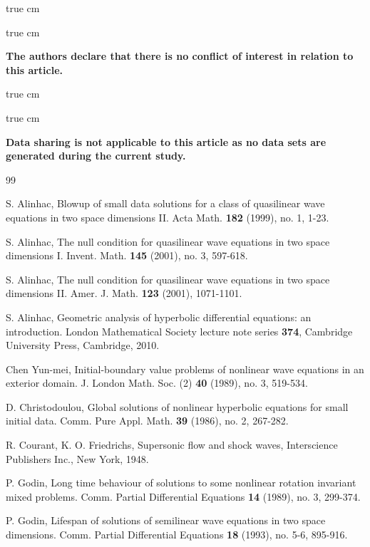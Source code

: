 \documentclass[11pt,twoside]{article}
\theoremstyle{plain}
\theoremstyle{definition}
\numberwithin{equation}{section}
\begin{document}


 true cm

{\bf \color{blue}{Conflict of Interest Statement:}}

 true cm

{\bf The authors declare that there is no conflict of interest in relation to this article.}

 true cm
{\bf \color{blue}{Data availability statement:}}

 true cm

{\bf  Data sharing is not applicable to this article as no data sets are generated
during the current study.}


\begin{thebibliography}{99}


S. Alinhac, Blowup of small data solutions for a class of quasilinear wave equations in two space dimensions II.
Acta Math. \textbf{182} (1999), no. 1, 1-23.

S. Alinhac, The null condition for quasilinear wave equations in two space dimensions I.
Invent. Math. \textbf{145} (2001), no. 3, 597-618.

S. Alinhac, The null condition for quasilinear wave equations in two space dimensions II.
Amer. J. Math. \textbf{123} (2001), 1071-1101.

 S. Alinhac, Geometric analysis of hyperbolic differential equations: an introduction.
London Mathematical Society lecture note series \textbf{374}, Cambridge University Press, Cambridge, 2010.


Chen Yun-mei, Initial-boundary value problems of nonlinear wave equations in an exterior domain.
J. London Math. Soc. (2) \textbf{40} (1989), no. 3, 519-534.

D. Christodoulou, Global solutions of nonlinear hyperbolic equations for small initial data.
Comm. Pure Appl. Math. \textbf{39} (1986), no. 2, 267-282.

 R. Courant, K. O. Friedrichs, Supersonic flow and shock waves,
Interscience Publishers Inc., New York, 1948.

P. Godin, Long time behaviour of solutions to some nonlinear rotation invariant mixed problems.
Comm. Partial Differential Equations \textbf{14} (1989), no. 3, 299-374.

P. Godin, Lifespan of solutions of semilinear wave equations in two space dimensions.
Comm. Partial Differential Equations \textbf{18} (1993), no. 5-6, 895-916.


\end{thebibliography}
\end{document}
